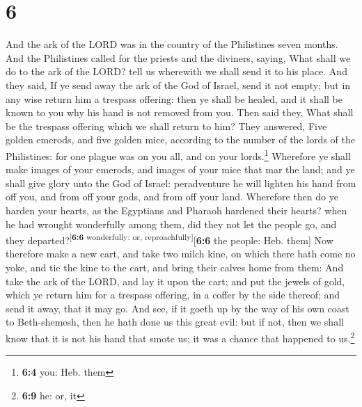\hypertarget{section-5}{%
\section{6}\label{section-5}}

 And the ark of the LORD was in the country of the
Philistines seven months.  And the Philistines called for
the priests and the diviners, saying, What shall we do to the ark of the
LORD? tell us wherewith we shall send it to his place. 
And they said, If ye send away the ark of the God of Israel, send it not
empty; but in any wise return him a trespass offering: then ye shall be
healed, and it shall be known to you why his hand is not removed from
you.  Then said they, What shall be the trespass offering
which we shall return to him? They answered, Five golden emerods, and
five golden mice, according to the number of the lords of the
Philistines: for one plague was on you all, and on your
lords.\footnote{\textbf{6:4} you: Heb. them}  Wherefore ye
shall make images of your emerods, and images of your mice that mar the
land; and ye shall give glory unto the God of Israel: peradventure he
will lighten his hand from off you, and from off your gods, and from off
your land.  Wherefore then do ye harden your hearts, as
the Egyptians and Pharaoh hardened their hearts? when he had wrought
wonderfully among them, did they not let the people go, and they
departed?\textsuperscript{{[}\textbf{6:6} wonderfully: or,
reproachfully{]}}{[}\textbf{6:6} the people: Heb. them{]} 
Now therefore make a new cart, and take two milch kine, on which there
hath come no yoke, and tie the kine to the cart, and bring their calves
home from them:  And take the ark of the LORD, and lay it
upon the cart; and put the jewels of gold, which ye return him for a
trespass offering, in a coffer by the side thereof; and send it away,
that it may go.  And see, if it goeth up by the way of his
own coast to Beth-shemesh, then he hath done us this great evil: but if
not, then we shall know that it is not his hand that smote us; it was a
chance that happened to us.\footnote{\textbf{6:9} he: or, it}

